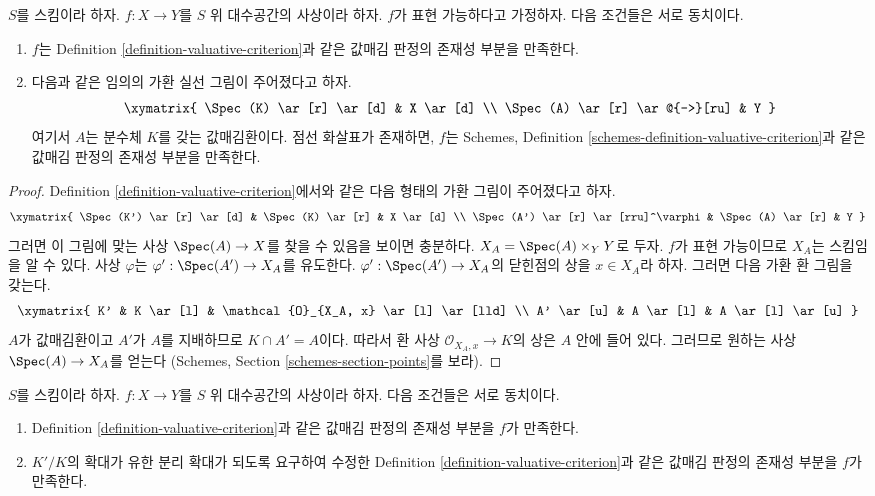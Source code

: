\begin{lemma}
\label{lemma-valuative-criterion-representable}
$S$를 스킴이라 하자.
$f : X \to Y$를 $S$ 위 대수공간의 사상이라 하자.
$f$가 표현 가능하다고 가정하자. 다음 조건들은 서로 동치이다.
\begin{enumerate}
\item $f$는 Definition \ref{definition-valuative-criterion}과 같은
값매김 판정의 존재성 부분을 만족한다.
\item 다음과 같은 임의의 가환 실선 그림이 주어졌다고 하자.
$$
\xymatrix{
\Spec(K) \ar[r] \ar[d] & X \ar[d] \\
\Spec(A) \ar[r] \ar@{-->}[ru] & Y
}
$$
여기서 $A$는 분수체 $K$를 갖는 값매김환이다. 점선 화살표가 존재하면,
$f$는 Schemes, Definition
\ref{schemes-definition-valuative-criterion}과 같은 값매김 판정의
존재성 부분을 만족한다.
\end{enumerate}
\end{lemma}

\begin{proof}
Definition \ref{definition-valuative-criterion}에서와 같은 다음 형태의
가환 그림이 주어졌다고 하자.
$$
\xymatrix{
\Spec(K') \ar[r] \ar[d] & \Spec(K) \ar[r] & X \ar[d] \\
\Spec(A') \ar[r] \ar[rru]^\varphi & \Spec(A) \ar[r] & Y
}
$$
그러면 이 그림에 맞는 사상 $\Spec(A) \to X$를 찾을 수 있음을 보이면
충분하다.
$X_A = \Spec(A) \times_Y Y$로 두자. $f$가 표현 가능이므로 $X_A$는
스킴임을 알 수 있다. 사상 $\varphi$는
$\varphi' : \Spec(A') \to X_A$를 유도한다. $\varphi' : \Spec(A') \to X_A$의
닫힌점의 상을 $x \in X_A$라 하자. 그러면 다음 가환 환 그림을 갖는다.
$$
\xymatrix{
K' & K \ar[l] & \mathcal{O}_{X_A, x} \ar[l] \ar[lld] \\
A' \ar[u] & A \ar[l] & A \ar[l] \ar[u]
}
$$
$A$가 값매김환이고 $A'$가 $A$를 지배하므로 $K \cap A' = A$이다.
따라서 환 사상 $\mathcal{O}_{X_A, x} \to K$의 상은 $A$ 안에 들어 있다.
그러므로 원하는 사상 $\Spec(A) \to X_A$를 얻는다
(Schemes, Section \ref{schemes-section-points}를 보라).
\end{proof}






\begin{lemma}
\label{lemma-finite-separable-enough}
$S$를 스킴이라 하자.
$f : X \to Y$를 $S$ 위 대수공간의 사상이라 하자.
다음 조건들은 서로 동치이다.
\begin{enumerate}
\item Definition \ref{definition-valuative-criterion}과 같은
값매김 판정의 존재성 부분을 $f$가 만족한다.
\item $K'/K$의 확대가 유한 분리 확대가 되도록 요구하여 수정한
Definition \ref{definition-valuative-criterion}과 같은 값매김 판정의
존재성 부분을 $f$가 만족한다.
\end{enumerate}
\end{lemma}


